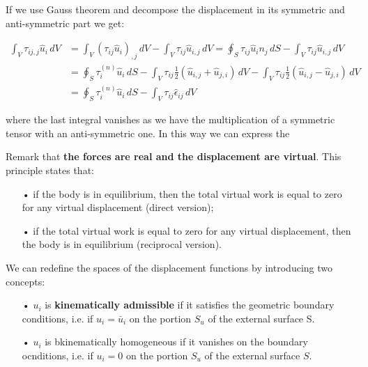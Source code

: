 	If we use Gauss theorem and decompose the displacement in its symmetric and anti-symmetric part we get:
	
	\begin{equation}
	\begin{aligned}
	\int _V \tau _{ij,j}\hat{u}_i \, dV &= \int _V (\tau _{ij}\hat{u}_i)_{,j} \, dV - \int _V \tau _{ij}\hat{u}_{i,j} \, dV = \oint _S \tau _{ij} \hat{u}_i n_j \, dS - \int _V \tau _{ij}\hat{u}_{i,j} \, dV \\
	&= \oint _S \tau _{i}^{(n)} \hat{u}_i \, dS - \int _V \tau _{ij} \frac{1}{2} (\hat{u}_{i,j} + \hat{u}_{j,i}) \, dV - \int _V \tau _{ij} \frac{1}{2} (\hat{u}_{i,j} - \hat{u}_{j,i}) \, dV\\
	 &= \oint _S \tau _{i}^{(n)} \hat{u}_i \, dS - \int _V \tau _{ij} \hat{\epsilon}_{ij} \, dV
	\end{aligned}	
	\end{equation}
	
	where the last integral vanishes as we have the multiplication of a symmetric tensor with an anti-symmetric one. In this way we can express the 
	
	\begin{center}
	\end{center}
	
	Remark that \textbf{the forces are real and the displacement are virtual}. This principle states that: 
	
	\begin{itemize}
	\item[•] if the body is in equilibrium, then the total virtual work is equal to zero for any virtual displacement (direct version);\\
	
	\item[•] if the total virtual work is equal to zero for any virtual displacement, then the body is in equilibrium (reciprocal version).
	\end{itemize}
	
	We can redefine the spaces of the displacement functions by introducing two concepts:
	
	\begin{itemize}
	\item[•] $u_i$ is \textbf{kinematically admissible} if it satisfies the geometric boundary conditions, i.e. if $u_i = \bar{u}_i$ on the portion $S_u$ of the external surface S. \\
	
	\item[•] $u_i$ is bkinematically homogeneous if it vanishes on the boundary ocnditions, i.e. if $u_i = 0$ on the portion $S_u$ of the external surface $S$.
	\end{itemize}
	
